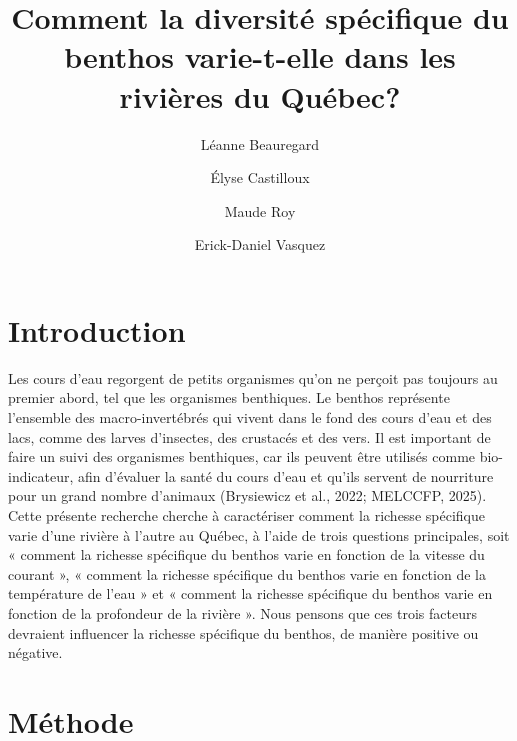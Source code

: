 \documentclass[9pt,twocolumn,twoside,]{pnas-new}
\title{Comment la diversité spécifique du benthos varie-t-elle dans les
rivières du Québec?}
\author[a]{Léanne Beauregard}
\author[a]{Élyse Castilloux}
\author[a]{Maude Roy}
\author[a]{Erick-Daniel Vasquez}
\affil[a]{Univeristé de Sherbrooke, Département de Biologie, Street,
City, State, Zip}
\begin{document}
\verticaladjustment{-2pt}



\maketitle
\thispagestyle{firststyle}


\acknow{}

\section{Introduction}\label{introduction}

Les cours d'eau regorgent de petits organismes qu'on ne perçoit pas
toujours au premier abord, tel que les organismes benthiques. Le benthos
représente l'ensemble des macro-invertébrés qui vivent dans le fond des
cours d'eau et des lacs, comme des larves d'insectes, des crustacés et
des vers. Il est important de faire un suivi des organismes benthiques,
car ils peuvent être utilisés comme bio-indicateur, afin d'évaluer la
santé du cours d'eau et qu'ils servent de nourriture pour un grand
nombre d'animaux (Brysiewicz et al., 2022; MELCCFP, 2025). Cette
présente recherche cherche à caractériser comment la richesse spécifique
varie d'une rivière à l'autre au Québec, à l'aide de trois questions
principales, soit « comment la richesse spécifique du benthos varie en
fonction de la vitesse du courant », « comment la richesse spécifique du
benthos varie en fonction de la température de l'eau » et « comment la
richesse spécifique du benthos varie en fonction de la profondeur de la
rivière ». Nous pensons que ces trois facteurs devraient influencer la
richesse spécifique du benthos, de manière positive ou négative.

\section{Méthode}\label{muxe9thode}
\end{document}

